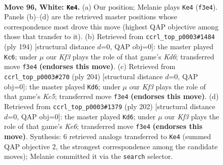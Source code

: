 \documentclass[11pt]{article}
\begin{document}
\clearpage

\begin{figure}[p]\centering
\begin{subfigure}{0.46\textwidth}\centering
\resizebox{\linewidth}{!}{%
\newchessgame
\chessboard[
  setfen={1Q6/6k1/8/8/8/5K2/8/8 w - - 3 96},
  showmover=false,
  pgfstyle=straightmove, color=movearrow, markmove={f3-e4}
]}
\caption{}
\end{subfigure}\hfill
\begin{subfigure}{0.46\textwidth}\centering
\resizebox{\linewidth}{!}{%
\newchessgame
\chessboard[
  setfen={1k6/8/3K4/Q7/8/8/8/8 w - - 9 98},
  showmover=false,
  pgfstyle=straightmove, color=movearrow, markmove={d6-c6}
]}
\caption{}
\end{subfigure}
\\[4pt]
\begin{subfigure}{0.46\textwidth}\centering
\resizebox{\linewidth}{!}{%
\newchessgame
\chessboard[
  setfen={3k4/6Q1/8/2K5/8/8/8/8 w - - 7 103},
  showmover=false,
  pgfstyle=straightmove, color=movearrow, markmove={c5-d6}
]}
\caption{}
\end{subfigure}\hfill
\begin{subfigure}{0.46\textwidth}\centering
\resizebox{\linewidth}{!}{%
\newchessgame
\chessboard[
  setfen={2k5/8/4K3/1Q6/8/8/8/8 w - - 11 102},
  showmover=false,
  pgfstyle=straightmove, color=movearrow, markmove={e6-d6}
]}
\caption{}
\end{subfigure}
\caption{\textbf{Move 96, White: \texttt{Ke4}.} (a) Our position; Melanie plays \texttt{Ke4} (\texttt{f3e4}). Panels (b)--(d) are the retrieved master positions whose correspondence most drove this move (highest QAP objective among those that transfer to it). (b) Retrieved from \texttt{ccrl\_top\_p0003\#1484} (ply 194) [structural distance $d$=0, QAP obj=0]: the master played \texttt{Kc6}; under $\mu$ our \emph{Kf3} plays the role of that game's \emph{Kd6}; transferred move \texttt{f3e4} \textbf{(endorses this move)}. (c) Retrieved from \texttt{ccrl\_top\_p0003\#270} (ply 204) [structural distance $d$=0, QAP obj=0]: the master played \texttt{Kd6}; under $\mu$ our \emph{Kf3} plays the role of that game's \emph{Kc5}; transferred move \texttt{f3e4} \textbf{(endorses this move)}. (d) Retrieved from \texttt{ccrl\_top\_p0003\#1379} (ply 202) [structural distance $d$=0, QAP obj=0]: the master played \texttt{Kd6}; under $\mu$ our \emph{Kf3} plays the role of that game's \emph{Ke6}; transferred move \texttt{f3e4} \textbf{(endorses this move)}. Synthesis: 6 retrieved analogs transferred to \texttt{Ke4} (summed QAP objective 2, the strongest correspondence among the candidate moves); Melanie committed it via the \texttt{search} selector.}
\label{fig:thought-m190}
\end{figure}
\end{document}
